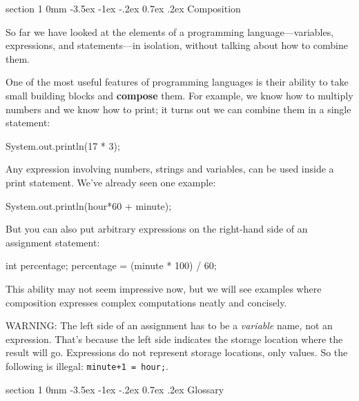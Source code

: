 \documentclass{book}
\makeatletter
\renewcommand{\section}{\@startsection 
    {section} {1} {0mm}%
    {-3.5ex \@plus -1ex \@minus -.2ex}%
    {0.7ex \@plus.2ex}%
    {\normalfont\Large\bfseries}}
\makeatother
\begin{document}
\section{Composition}

So far we have looked at the elements of a programming
language---variables, expressions, and statements---in
isolation, without talking about how to combine them.

One of the most useful features of programming languages
is their ability to take small building blocks and
{\bf compose} them.  For example, we know how to multiply
numbers and we know how to print; it turns out we can
combine them in a single statement:

\begin{verbatimtab}
    System.out.println(17 * 3);
\end{verbatimtab}
%
Any expression involving numbers, strings
and variables, can be used inside a print statement.  We've
already seen one example:

\begin{verbatimtab}
    System.out.println(hour*60 + minute);
\end{verbatimtab}
%
But you can also put arbitrary expressions on the right-hand
side of an assignment statement:

\begin{verbatimtab}
    int percentage;
    percentage = (minute * 100) / 60;
\end{verbatimtab}
%
This ability may not seem impressive now, but we will see
examples where composition 
expresses complex computations neatly and concisely.

WARNING: The left side of an assignment
has to be a {\em variable} name, not an expression.
That's because the left side indicates the storage location
where the result will go.  Expressions
do not represent storage locations, only values.  So the
following is illegal:  {\tt minute+1 = hour;}.

\section{Glossary}
\end{document}
